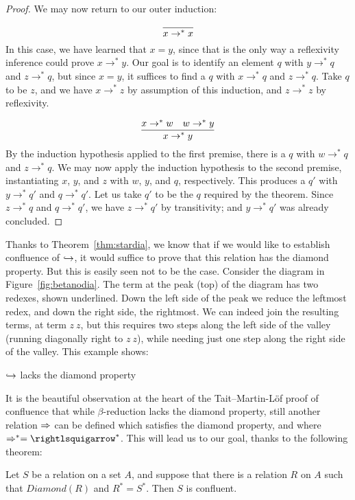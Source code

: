 \begin{proof}
  We may now return to our outer induction:

  \case{ }
  \[
  \infer{x \to^* x}{\ }
  \]
  \noindent In this case, we have learned that $x = y$, since that is the only way a reflexivity
  inference could prove $x \to^* y$.  Our goal is to identify an element $q$ with $y \to^* q$ and $z \to^* q$,
  but since $x = y$, it suffices to find a $q$ with $x \to^* q$ and $z \to^* q$.  Take $q$ to be $z$, and
  we have $x \to^* z$ by assumption of this induction, and $z \to^* z$ by reflexivity.

  \case{ }
  \[
  \infer{x \to^* y}{x \to^* w & w \to^* y}
  \]
  \noindent By the induction hypothesis applied to the first premise, there is a $q$ with
  $w \to^* q$ and $z \to^* q$.  We may now apply the induction hypothesis to the second
  premise, instantiating $x$, $y$, and $z$ with $w$, $y$, and $q$, respectively.  This
  produces a $q'$ with $y\to^* q'$ and $q\to^* q'$.  Let us take $q'$ to be the $q$ required
  by the theorem.  Since $z\to^*q$ and $q\to^* q'$, we have $z \to^* q'$ by transitivity;
  and $y\to^* q'$ was already concluded.
  

  \end{proof}

Thanks to Theorem~\ref{thm:stardia}, we know that if we would like to establish confluence of $\hookrightarrow$, it
would suffice to prove that this relation has the diamond property.  But this is easily seen
not to be the case.  Consider the diagram in Figure~\ref{fig:betanodia}.  The term at the peak (top) of the diagram
has two redexes, shown underlined.  Down the left side of the peak we reduce the leftmost redex, and down the right
side, the rightmost.  We can indeed join the resulting terms, at term $z\ z$, but this requires two steps along the
left side of the valley (running diagonally right to $z\ z$), while needing just one step along the right
side of the valley.  This example shows:

\begin{theorem}
  $\hookrightarrow$ lacks the diamond property
\end{theorem}

It is the beautiful observation at the heart of the Tait--Martin-L\"of proof of confluence that
while $\beta$-reduction lacks the diamond property, still another relation $\Rightarrow$ can be defined which
satisfies the diamond property, and where $\Pred^* = \betaa^*$.  This will lead us to our goal,
thanks to the following theorem:
\begin{theorem}
  \label{thm:tml}
  Let $S$ be a relation on a set $A$, and suppose that there is a relation $R$ on $A$ such that
  $\textit{Diamond}(R)$ and $R^* = S^*$.  Then $S$ is confluent.
\end{theorem}

